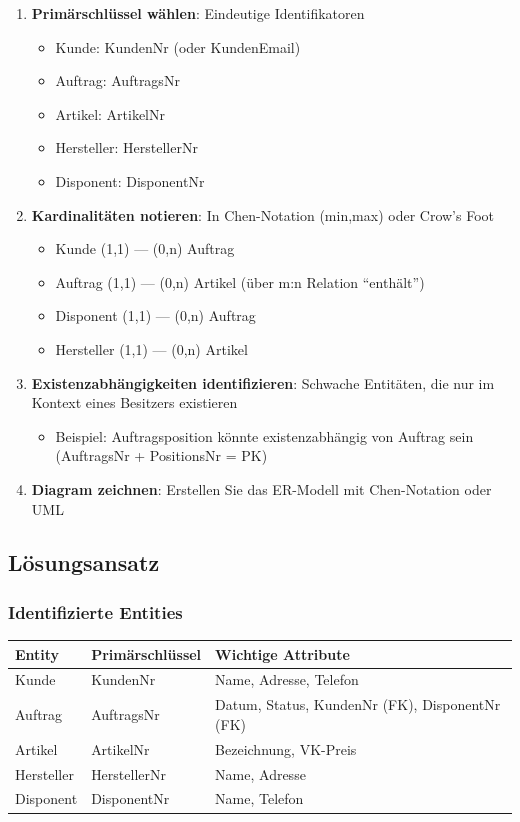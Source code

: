 \documentclass[a4paper]{article}
\begin{document}
\begin{enumerate}
    \item \textbf{Primärschlüssel wählen}: Eindeutige Identifikatoren
    \begin{itemize}
        \item Kunde: KundenNr (oder KundenEmail)
        \item Auftrag: AuftragsNr
        \item Artikel: ArtikelNr
        \item Hersteller: HerstellerNr
        \item Disponent: DisponentNr
    \end{itemize}
    
    \item \textbf{Kardinalitäten notieren}: In Chen-Notation (min,max) oder Crow's Foot
    \begin{itemize}
        \item Kunde (1,1) --- (0,n) Auftrag
        \item Auftrag (1,1) --- (0,n) Artikel (über m:n Relation ``enthält'')
        \item Disponent (1,1) --- (0,n) Auftrag
        \item Hersteller (1,1) --- (0,n) Artikel
    \end{itemize}
    
    \item \textbf{Existenzabhängigkeiten identifizieren}: Schwache Entitäten, die nur im Kontext eines 
    Besitzers existieren
    \begin{itemize}
        \item Beispiel: Auftragsposition könnte existenzabhängig von Auftrag sein (AuftragsNr + PositionsNr = PK)
    \end{itemize}
    
    \item \textbf{Diagram zeichnen}: Erstellen Sie das ER-Modell mit Chen-Notation oder UML
\end{enumerate}

\subsection{Lösungsansatz}

\subsubsection{Identifizierte Entities}

\begin{tabular}{|l|l|l|}
\hline
\textbf{Entity} & \textbf{Primärschlüssel} & \textbf{Wichtige Attribute} \\
\hline
Kunde & KundenNr & Name, Adresse, Telefon \\
Auftrag & AuftragsNr & Datum, Status, KundenNr (FK), DisponentNr (FK) \\
Artikel & ArtikelNr & Bezeichnung, VK-Preis \\
Hersteller & HerstellerNr & Name, Adresse \\
Disponent & DisponentNr & Name, Telefon \\
\hline
\end{tabular}
\end{document}
